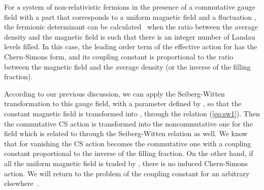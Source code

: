 \documentclass[a4paper,12pt]{article}
\begin{document}
For a system of non-relativistic fermions in the presence of a
commutative gauge field with a part that corresponds to a uniform
magnetic field \coordHE{} and a fluctuation \coordHE{}, the fermionic
determinant
can be calculated~\cite{lf} when the ratio between the average
density
and the magnetic field is such that there is an integer number of
Landau levels filled. In this case, the leading order term of the
effective action for \coordHE{} has the Chern-Simons form, and its
coupling
constant is proportional to the ratio between the magnetic field
and
the average density (or the inverse of the filling fraction).

According to our previous discussion, we can apply the
Seiberg-Witten
transformation to this gauge field, with a \myHighlight{$\theta$}\coordHE{} parameter
defined by
\coordHE{}, so that the constant magnetic field \coordHE{} is
transformed
into \coordHE{}, through the relation (\ref{eq:sw1}).
Then
the commutative CS action is transformed into the noncommutative
one
\cite{gs} for the field \coordHE{} which is related to \coordHE{}
through
the Seiberg-Witten relation as well. We know that for vanishing
\myHighlight{$\theta$}\coordHE{}
the CS action becomes the commutative one with a coupling constant
proportional to the inverse of the filling fraction. On the other
hand, if all the uniform magnetic field is traded by \coordHE{},
there is
no induced Chern-Simons action. We will return to the problem of
the
coupling constant for an arbitrary \myHighlight{$\theta$}\coordHE{} elsewhere~\cite{IP}.
\end{document}
